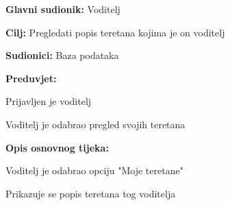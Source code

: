 				\noindent {}
				\begin{packed_item}
					
					\item \textbf{Glavni sudionik: } Voditelj
					\item  \textbf{Cilj:} Pregledati popis teretana kojima je on voditelj
					\item  \textbf{Sudionici:} Baza podataka
					\item  \textbf{Preduvjet:}
					\item[] \begin{packed_enum}
						
						\item Prijavljen je voditelj
						\item Voditelj je odabrao pregled svojih teretana
						
					\end{packed_enum}
					\item  \textbf{Opis osnovnog tijeka:}
					
					\item[] \begin{packed_enum}
						
						\item Voditelj  je odabrao opciju "Moje teretane"
						\item Prikazuje se popis teretana tog voditelja
					\end{packed_enum}
					
					
				\end{packed_item}
				
